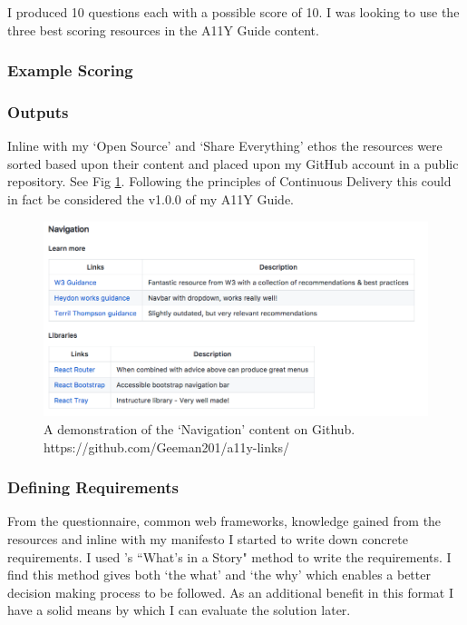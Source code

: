 I produced 10 questions each with a possible score of 10. I was looking to
use the three best scoring resources in the A11Y Guide content.

\subsubsection{Example Scoring}


\subsubsection{Outputs}
Inline with my `Open Source' and `Share Everything' ethos the resources were
sorted based upon their content and placed upon my GitHub account in a public
 repository.
See Fig \ref{fig:allyLinksDemo}.
Following the principles of Continuous Delivery this could in fact be
considered the v1.0.0 of my A11Y Guide.

\begin{figure}[H]
\centering
\includegraphics[width=\textwidth]{figures/documentation_link_example}
\captionsetup{justification=centering}
\caption{A demonstration of the `Navigation' content on Github.
https://github.com/Geeman201/a11y-links/
\label{fig:allyLinksDemo}}
\end{figure}


\subsubsection{Defining Requirements}
\label{sec:requirements}
From the questionnaire, common web frameworks, knowledge gained from the
resources and inline with my manifesto I started to write down concrete
requirements. I used \cite*{DanNorth}'s ``What's in a Story" method to write the
requirements. I find this method gives both `the what' and `the why' which
enables a better decision making process to be followed. As an additional
benefit in this format I have a solid means by which I can evaluate the
solution later.

